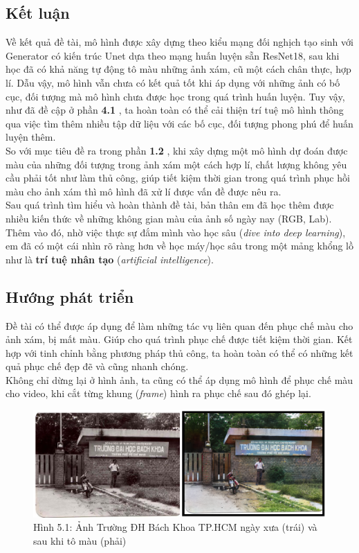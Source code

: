 \documentclass[a4paper]{article}
\begin{document}
\subsection{Kết luận}
Về kết quả đề tài, mô hình được xây dựng theo kiểu mạng đối nghịch tạo sinh với Generator có kiến trúc Unet dựa theo mạng huấn luyện sẵn ResNet18, sau khi học đã có khả năng tự động tô màu những ảnh xám, cũ một cách chân thực, hợp lí. Dẫu vậy, mô hình vẫn chưa có kết quả tốt khi áp dụng với những ảnh có bố cục, đối tượng mà mô hình chưa được học trong quá trình huấn luyện. Tuy vậy, như đã đề cập ở phần \textbf{4.1 }, ta hoàn toàn có thể cải thiện trí tuệ mô hình thông qua việc tìm thêm nhiều tập dữ liệu với các bố cục, đối tượng phong phú để huấn luyện thêm.\\
So với mục tiêu đề ra trong phần \textbf{1.2 }, khi xây dựng một mô hình dự đoán được màu của những đối tượng trong ảnh xám một cách hợp lí, chất lượng không yêu cầu phải tốt như làm thủ công, giúp tiết kiệm thời gian trong quá trình phục hồi màu cho ảnh xám thì mô hình đã xử lí được vấn đề được nêu ra.\\

\noindent
Sau quá trình tìm hiểu và hoàn thành đề tài, bản thân em đã học thêm được nhiều kiến thức về những không gian màu của ảnh số ngày nay (RGB, Lab). Thêm vào đó, nhờ việc thực sự đắm mình vào học sâu (\textit{dive into deep learning}), em đã có một cái nhìn rõ ràng hơn về học máy/học sâu trong một mảng khổng lồ như là \textbf{trí tuệ nhân tạo} (\textit{artificial intelligence}).

\subsection{Hướng phát triển}
Đề tài có thể được áp dụng để làm những tác vụ liên quan đến phục chế màu cho ảnh xám, bị mất màu. Giúp cho quá trình phục chế được tiết kiệm thời gian. Kết hợp với tinh chỉnh bằng phương pháp thủ công, ta hoàn toàn có thể có những kết quả phục chế đẹp đẽ và cũng nhanh chóng.\\
Không chỉ dừng lại ở hình ảnh, ta cũng có thể áp dụng mô hình để phục chế màu cho video, khi cắt từng khung (\textit{frame}) hình ra phục chế sau đó ghép lại.

\begin{figure}[h!]
\centering
\includegraphics[width=17cm]{images/5_1.PNG}
\caption{Hình 5.1: Ảnh Trường ĐH Bách Khoa TP.HCM ngày xưa (trái) và sau khi tô màu (phải)}
\end{figure}
\end{document}
